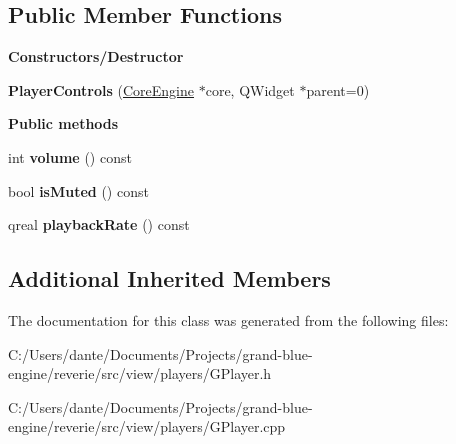 \subsection*{Public Member Functions}
\begin{Indent}\textbf{ Constructors/\+Destructor}\par
\begin{DoxyCompactItemize}
\item 
\mbox{\label{classrev_1_1_view_1_1_player_controls_a0f5ea7902b377c039f62cea494a96a75}} 
{\bfseries Player\+Controls} (\mbox{\hyperlink{classrev_1_1_core_engine}{Core\+Engine}} $\ast$core, Q\+Widget $\ast$parent=0)
\end{DoxyCompactItemize}
\end{Indent}
\begin{Indent}\textbf{ Public methods}\par
\begin{DoxyCompactItemize}
\item 
\mbox{\label{classrev_1_1_view_1_1_player_controls_a684a174ee4289966229dcd25f5743df7}} 
int {\bfseries volume} () const
\item 
\mbox{\label{classrev_1_1_view_1_1_player_controls_a5720676de95678a16b9ef413ee90af91}} 
bool {\bfseries is\+Muted} () const
\item 
\mbox{\label{classrev_1_1_view_1_1_player_controls_a841741272fceac5775f8988a26e7db7c}} 
qreal {\bfseries playback\+Rate} () const
\end{DoxyCompactItemize}
\end{Indent}
\subsection*{Additional Inherited Members}


The documentation for this class was generated from the following files\+:\begin{DoxyCompactItemize}
\item 
C\+:/\+Users/dante/\+Documents/\+Projects/grand-\/blue-\/engine/reverie/src/view/players/G\+Player.\+h\item 
C\+:/\+Users/dante/\+Documents/\+Projects/grand-\/blue-\/engine/reverie/src/view/players/G\+Player.\+cpp\end{DoxyCompactItemize}
